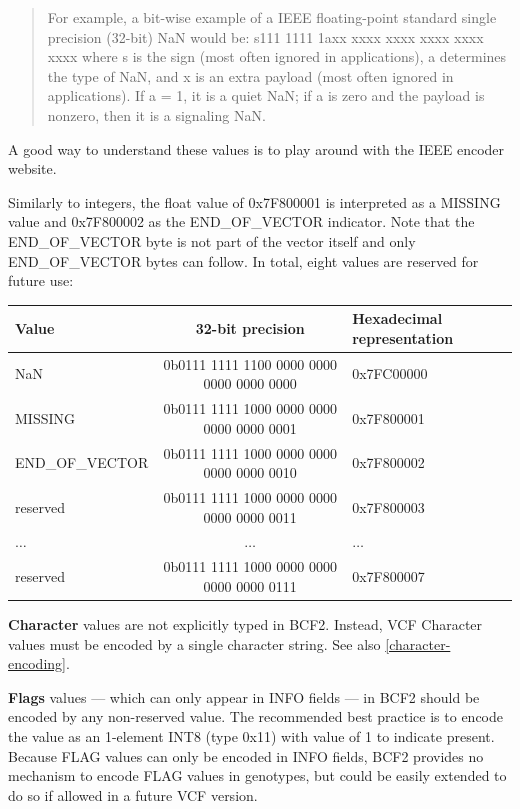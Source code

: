 \documentclass[8pt]{article}
\begin{document}
\begin{quote}
For example, a bit-wise example of a IEEE floating-point standard single precision (32-bit) NaN would be: s111 1111 1axx xxxx xxxx xxxx xxxx xxxx where s is the sign (most often ignored in applications), a determines the type of NaN, and x is an extra payload (most often ignored in applications).
If a = 1, it is a quiet NaN; if a is zero and the payload is nonzero, then it is a signaling NaN.
\end{quote}

\noindent A good way to understand these values is to play around with the IEEE encoder website.

\vspace{0.3cm}
\noindent Similarly to integers, the float value of 0x7F800001 is interpreted as a MISSING value and 0x7F800002 as the END\_OF\_VECTOR indicator.
Note that the END\_OF\_VECTOR byte is not part of the vector itself and only END\_OF\_VECTOR bytes can follow.
In total, eight values are reserved for future use:


\vspace{0.1cm}
\begin{tabular}{| l | c | l |} \hline
\textbf{Value}   & \textbf{32-bit precision} & \textbf{Hexadecimal representation} \\ \hline
NaN	    & 0b0111 1111 1100 0000 0000 0000 0000 0000 & 0x7FC00000 \\ \hline
MISSING & 0b0111 1111 1000 0000 0000 0000 0000 0001 & 0x7F800001 \\ \hline
END\_OF\_VECTOR & 0b0111 1111 1000 0000 0000 0000 0000 0010 & 0x7F800002 \\ \hline
reserved & 0b0111 1111 1000 0000 0000 0000 0000 0011 & 0x7F800003 \\ \hline
$\ldots$ & $\ldots$ & $\ldots$ \\ \hline
reserved & 0b0111 1111 1000 0000 0000 0000 0000 0111 & 0x7F800007 \\ \hline
\end{tabular}

\vspace{0.3cm}
\textbf{Character} values are not explicitly typed in BCF2.
Instead, VCF Character values must be encoded by a single character string. See also \ref{character-encoding}.

\vspace{0.3cm}
\textbf{Flags} values --- which can only appear in INFO fields --- in BCF2 should be encoded by any non-reserved value.
The recommended best practice is to encode the value as an 1-element INT8 (type 0x11) with value of 1 to indicate present.
Because FLAG values can only be encoded in INFO fields, BCF2 provides no mechanism to encode FLAG values in genotypes, but could be easily extended to do so if allowed in a future VCF version.
\end{document}
